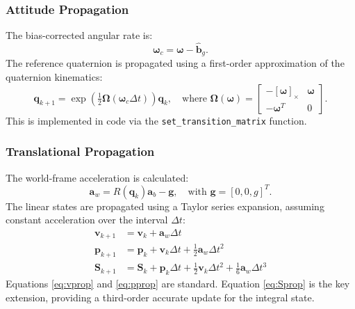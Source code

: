 \documentclass[11pt]{article}
\begin{document}
\subsubsection{Attitude Propagation}
The bias-corrected angular rate is:
\[
\bm{\omega}_c = \bm{\omega} - \hat{\bm{b}}_g.
\]
The reference quaternion is propagated using a first-order approximation of the quaternion kinematics:
\begin{equation}
\bm{q}_{k+1} = \exp\!\left( \tfrac{1}{2} \bm{\Omega}(\bm{\omega}_c \Delta t) \right) \bm{q}_k, \quad \text{where } \bm{\Omega}(\bm{\omega}) = \begin{bmatrix}
-[\bm{\omega}]_\times & \bm{\omega} \\
-\bm{\omega}^T & 0
\end{bmatrix}.
\end{equation}
This is implemented in code via the \texttt{set\_transition\_matrix} function.

\subsubsection{Translational Propagation}
The world-frame acceleration is calculated:
\begin{equation}
\bm{a}_w = R(\bm{q}_k) \bm{a}_b - \bm{g}, \quad \text{with } \bm{g} = [0, 0, g]^T.
\end{equation}
The linear states are propagated using a Taylor series expansion, assuming constant acceleration over the interval $\Delta t$:
\begin{align}
\bm{v}_{k+1} &= \bm{v}_k + \bm{a}_w \Delta t \label{eq:vprop} \\
\bm{p}_{k+1} &= \bm{p}_k + \bm{v}_k \Delta t + \tfrac{1}{2}\bm{a}_w \Delta t^2 \label{eq:pprop} \\
\bm{S}_{k+1} &= \bm{S}_k + \bm{p}_k \Delta t + \tfrac{1}{2}\bm{v}_k \Delta t^2 + \tfrac{1}{6}\bm{a}_w \Delta t^3 \label{eq:Sprop}
\end{align}
Equations \ref{eq:vprop} and \ref{eq:pprop} are standard. Equation \ref{eq:Sprop} is the key extension, providing a third-order accurate update for the integral state.
\end{document}
